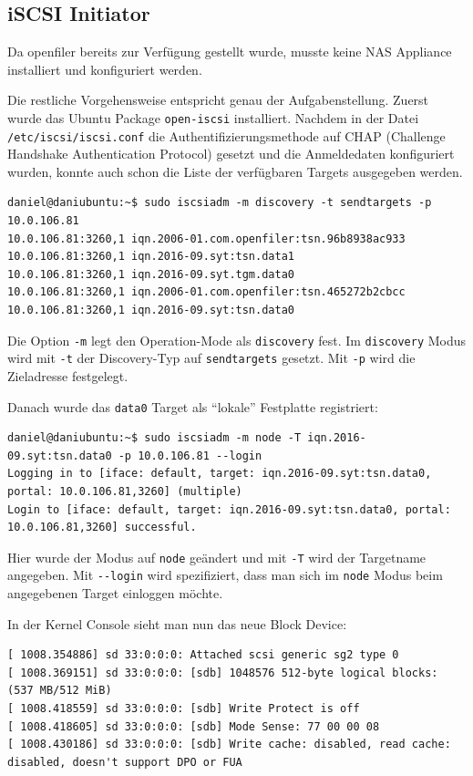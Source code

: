 \subsection{iSCSI Initiator}
Da openfiler bereits zur Verfügung gestellt wurde, musste keine NAS Appliance installiert und konfiguriert werden.

Die restliche Vorgehensweise entspricht genau der Aufgabenstellung. Zuerst wurde das Ubuntu Package \texttt{open-iscsi} installiert. Nachdem in der Datei \texttt{/etc/iscsi/iscsi.conf} die Authentifizierungsmethode auf CHAP (Challenge Handshake Authentication Protocol) gesetzt und die Anmeldedaten konfiguriert wurden, konnte auch schon die Liste der verfügbaren Targets ausgegeben werden.

\begin{lstlisting}[style=bash, caption=Verfügbare Targets]
daniel@daniubuntu:~$ sudo iscsiadm -m discovery -t sendtargets -p 10.0.106.81
10.0.106.81:3260,1 iqn.2006-01.com.openfiler:tsn.96b8938ac933
10.0.106.81:3260,1 iqn.2016-09.syt:tsn.data1
10.0.106.81:3260,1 iqn.2016-09.syt.tgm.data0
10.0.106.81:3260,1 iqn.2006-01.com.openfiler:tsn.465272b2cbcc
10.0.106.81:3260,1 iqn.2016-09.syt:tsn.data0
\end{lstlisting}
Die Option \texttt{-m} legt den Operation-Mode als \texttt{discovery} fest. Im \texttt{discovery} Modus wird mit \texttt{-t} der Discovery-Typ auf \texttt{sendtargets} gesetzt. Mit \texttt{-p} wird die Zieladresse festgelegt.

Danach wurde das \texttt{data0} Target als ``lokale'' Festplatte registriert:
\begin{lstlisting}[style=bash, caption=Target ``lokal'' registrieren]
daniel@daniubuntu:~$ sudo iscsiadm -m node -T iqn.2016-09.syt:tsn.data0 -p 10.0.106.81 --login
Logging in to [iface: default, target: iqn.2016-09.syt:tsn.data0, portal: 10.0.106.81,3260] (multiple)
Login to [iface: default, target: iqn.2016-09.syt:tsn.data0, portal: 10.0.106.81,3260] successful.
\end{lstlisting}
Hier wurde der Modus auf \texttt{node} geändert und mit \texttt{-T} wird der Targetname angegeben. Mit \texttt{-{}-login} wird spezifiziert, dass man sich im \texttt{node} Modus beim angegebenen Target einloggen möchte.

In der Kernel Console sieht man nun das neue Block Device:
\begin{lstlisting}[style=bash, caption=neues Block Device]
[ 1008.354886] sd 33:0:0:0: Attached scsi generic sg2 type 0
[ 1008.369151] sd 33:0:0:0: [sdb] 1048576 512-byte logical blocks: (537 MB/512 MiB)
[ 1008.418559] sd 33:0:0:0: [sdb] Write Protect is off
[ 1008.418605] sd 33:0:0:0: [sdb] Mode Sense: 77 00 00 08
[ 1008.430186] sd 33:0:0:0: [sdb] Write cache: disabled, read cache: disabled, doesn't support DPO or FUA
\end{lstlisting}

